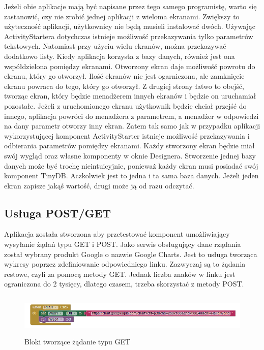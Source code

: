 Jeżeli obie aplikacje mają być napisane przez tego samego programistę, warto się zastanowić, czy nie zrobić jednej aplikacji z wieloma ekranami. Zwiększy to użyteczność aplikacji, użytkownicy nie będą musieli instalować dwóch. Używając ActivityStartera dotychczas istnieje możliwość przekazywania tylko parametrów tekstowych. Natomiast przy użyciu wielu ekranów, można przekazywać dodatkowo listy. Kiedy aplikacja korzysta z bazy danych, również jest ona współdzielona pomiędzy ekranami. Otworzony ekran daje możliwość powrotu do ekranu, który go otworzył. Ilość ekranów nie jest ogarniczona, ale zamknięcie ekranu powraca do tego, który go otworzył. Z drugiej strony łatwo to obejść, tworząc ekran, który będzie menadżerem innych ekranów i będzie on uruchamiał pozostałe. Jeżeli z uruchomionego ekranu użytkownik będzie chciał przejść do innego, aplikacja powróci do menadżera z parametrem, a menadżer w odpowiedzi na dany parametr otworzy inny ekran. Zatem tak samo jak w przypadku aplikacji wykorzystującej komponent ActivityStarter istnieje możliwość przekazywania i odbierania parametrów pomiędzy ekranami. Każdy stworzony ekran będzie miał swój wygląd oraz własne komponenty w oknie Designera. Stworzenie jednej bazy danych może być trochę nieintuicyjnie, ponieważ każdy ekran musi posiadać swój komponent TinyDB. Aczkolwiek jest to jedna i ta sama baza danych. Jeżeli jeden ekran zapisze jakąś wartość, drugi może ją od razu odczytać.

\subsection{Usługa POST/GET}

Aplikacja została stworzona aby przetestować komponent umożliwiający wysyłanie żądań typu GET i POST. Jako serwis obsługujący dane rządania został wybrany produkt Google o nazwie Google Charts.\cite{android:56} Jest to usługa tworząca wykresy poprzez zdefiniowanie odpowiedniego linku. Zazwyczaj są to żądania restowe, czyli za pomocą metody GET. Jednak liczba znaków w linku jest ograniczona do 2 tysięcy, dlatego czasem, trzeba skorzystać z metody POST. 


\begin{figure}[H]
\centering\includegraphics[height=2cm]{figures/apps/getRequest}
\caption{Bloki tworzące żądanie typu GET}
\end{figure}

